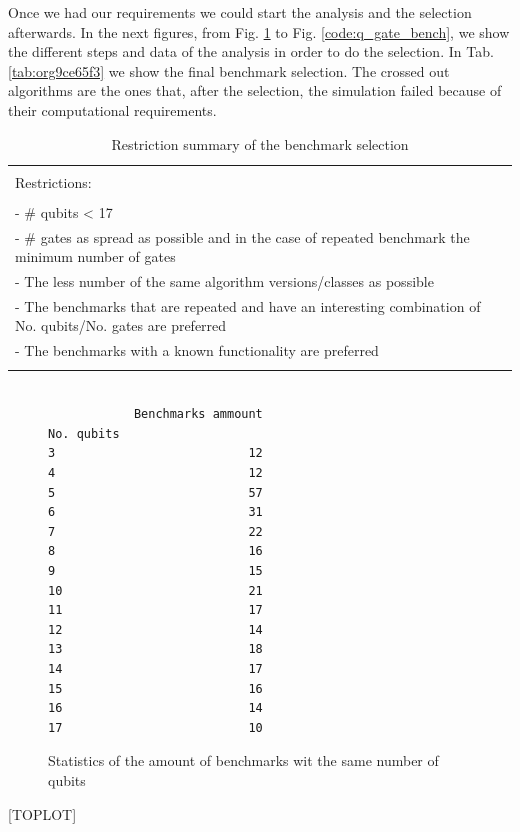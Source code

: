 Once we had our requirements we could start the analysis and the selection afterwards.
In the next figures, from Fig. \ref{code:no_q_statistics} to Fig. \ref{code:q_gate_bench}, we show the different steps and data of the analysis in order to do the selection.
In Tab. \ref{tab:org9ce65f3} we show the final benchmark selection.
The crossed out algorithms are the ones that, after the selection, the simulation failed because of their computational requirements.
\begin{table}[htbp]
\caption{\label{tab:org6766617}
Restriction summary of the benchmark selection}
\centering
\begin{tabular}{|l|}
\hline
\\
Restrictions:\\
\\
- \# qubits < 17\\
- \# gates as spread as possible and in the case of repeated benchmark the minimum number of gates\\
- The less number of the same algorithm versions/classes as possible\\
- The benchmarks that are repeated and have an interesting combination of No. qubits/No. gates are  preferred\\
- The benchmarks with a known functionality are preferred\\
\\
\hline
\end{tabular}
\end{table}

\begin{figure}
\centering

\begin{verbatim}

            Benchmarks ammount
No. qubits
3                           12
4                           12
5                           57
6                           31
7                           22
8                           16
9                           15
10                          21
11                          17
12                          14
13                          18
14                          17
15                          16
16                          14
17                          10

\end{verbatim}


\label{code:no_q_statistics}
\caption{Statistics of the amount of benchmarks wit the same number of qubits}
\end{figure}
[TOPLOT]

